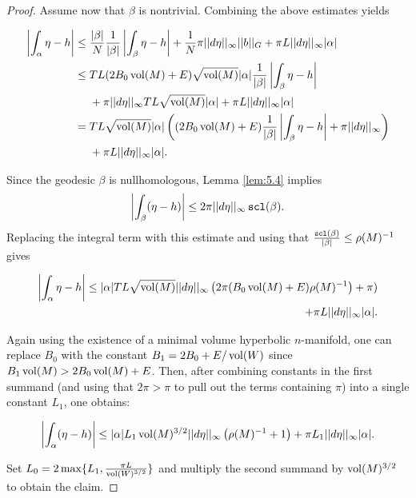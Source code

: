 \begin{proof}
Assume now that $\beta$ is nontrivial. Combining the above estimates yields

\begin{align*}
\left|\int_{\alpha}\eta-h\right| &\leq \frac{|\beta|}{N} \frac{1}{|\beta|} \left|\int_{\beta}\eta-h\right| + \frac{1}{N}\pi||d\eta||_{\infty}||b||_G + \pi L ||d\eta||_{\infty}|\alpha| \\
&\leq TL(2B_0\operatorname{vol}(M)+E)\sqrt{\operatorname{vol}(M)}|\alpha| \frac{1}{|\beta|} \left|\int_{\beta}\eta-h\right| \\
&~~~~+ \pi||d\eta||_{\infty} TL\sqrt{\operatorname{vol}(M)}|\alpha | + \pi L ||d\eta||_{\infty}|\alpha|
 \\
&= TL\sqrt{\operatorname{vol}(M)}|\alpha|\left((2B_0\operatorname{vol}(M) + E)\frac{1}{|\beta|}\left|\int_{\beta}\eta-h\right|  + \pi||d\eta||_{\infty}\right) \\
&~~~~+ \pi L ||d\eta||_{\infty}|\alpha|.
\end{align*}

Since the geodesic $\beta$ is nullhomologous, Lemma \ref{lem:5.4} implies $$\left|\int_{\beta}(\eta-h) \right|\leq 2\pi||d\eta||_{\infty}\operatorname{{\tt{scl}}}(\beta).$$ Replacing the integral term with this estimate and using that $\frac{\operatorname{{\tt{scl}}}(\beta)}{|\beta|}\leq\rho(M)^{-1}$ gives

\begin{align*}
\left|\int_{\alpha}\eta-h\right| \leq |\alpha| TL\sqrt{\operatorname{vol}(M)} ||d\eta||_{\infty}\left(2\pi(B_0\operatorname{vol}(M) + E)\rho(M)^{-1}\right)+ \pi) \\
+ \pi L ||d \eta||_{\infty}|\alpha|.
\end{align*}

Again using the existence of a minimal volume hyperbolic $n$-manifold, one can replace $B_0$ with the constant $B_1 = 2B_0 + E/\operatorname{vol}(W)$ since $B_1\operatorname{vol}(M) > 2B_0\operatorname{vol}(M) + E$. Then, after combining constants in the first summand (and using that $2\pi > \pi$ to pull out the terms containing $\pi$) into a single constant $L_1$, one obtains:

$$\left|\int_{\alpha}(\eta - h)\right|\leq |\alpha| L_1\operatorname{vol}(M)^{3/2} ||d\eta||_{\infty}\left(\rho(M)^{-1} + 1 \right) + \pi L_1 ||d\eta||_{\infty}|\alpha|. $$

Set $L_0 =2\max\{L_1,\frac{\pi L}{\operatorname{vol}(W)^{3/2}}\}$ and multiply the second summand by $\operatorname{vol}(M)^{3/2}$ to obtain the claim.

\end{proof}

